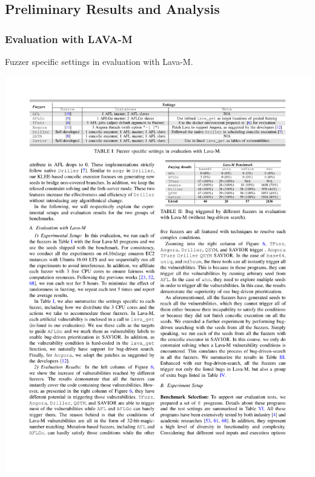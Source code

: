 \subsection{Preliminary Results and Analysis}
\label{savior:sec:eval}

\subsubsection{Evaluation with LAVA-M}


\begin{table}[h]
	\centering
		\caption{Fuzzer specific settings in evaluation with Lava-M.}
		\label{tab:lava-setup}
		\includegraphics[scale=1]{savior/tables/lavasetup}
\end{table}

